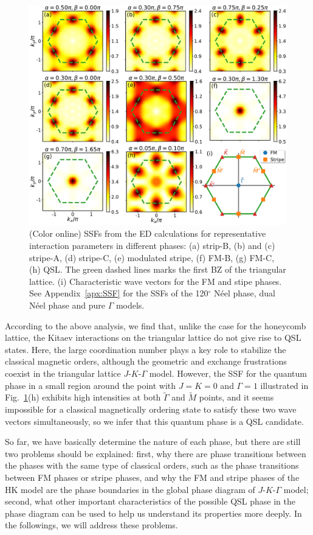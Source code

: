 \documentclass[aps,prb,reprint,amsfonts,amsmath,amssymb,showpacs,groupedaddress,superscriptaddress]{revtex4-1}
\begin{document}
\begin{figure}
    \centering
    \includegraphics[width=\columnwidth]{fig/StructureFactors.pdf}
    \caption{\label{fig:StructureFactors}(Color online) SSFs from the ED calculations for representative interaction parameters in different phases: (a) strip-B, (b) and (c) stripe-A, (d) stripe-C, (e) modulated stripe, (f) FM-B, (g) FM-C, (h) QSL. The green dashed lines marks the first BZ of the triangular lattice. (i) Characteristic wave vectors for the FM and stipe phases. See Appendix~\ref{apx:SSF} for the SSFs of the 120$^\circ$ N\'{e}el phase, dual N\'{e}el phase and pure $\Gamma$ models.}
\end{figure}

According to the above analysis, we find that, unlike the case for the honeycomb lattice, the Kitaev interactions on the triangular lattice do not give rise to QSL states. Here, the large coordination number plays a key role to stabilize the classical magnetic orders, although the geometric and exchange frustrations coexist in the triangular lattice $J$-$K$-$\Gamma$ model. However, the SSF for the quantum phase in a small region around the point with $J=K=0$ and $\Gamma=1$ illustrated in Fig.~\ref{fig:StructureFactors}(h) exhibits high intensities at both $\tilde{\Gamma}$ and $\tilde{M}$ points, and it seems impossible for a classical magnetically ordering state to satisfy these two wave vectors simultaneously, so we infer that this quantum phase is a QSL candidate.

So far, we have basically determine the nature of each phase, but there are still two problems should be explained: first, why there are phase transitions between the phases with the same type of classical orders, such as the phase transitions between FM phases or stripe phases, and why the FM and stripe phases of the HK model are the phase boundaries in the global phase diagram of $J$-$K$-$\Gamma$ model; second, what other important characteristics of the possible QSL phase in the phase diagram can be used to help us understand its properties more deeply. In the followings, we will address these problems.
\end{document}
